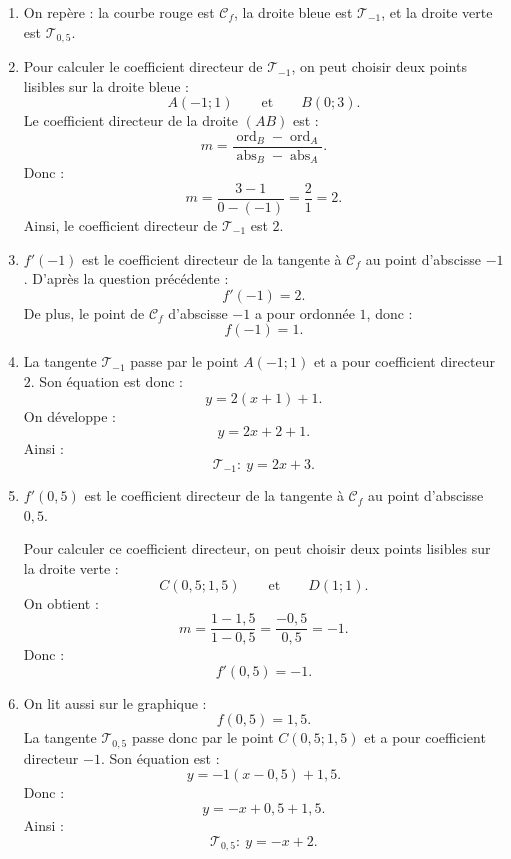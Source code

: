 \documentclass[11pt,a4paper]{article}
\begin{document}
\begin{enumerate}[label=\textbf{\arabic*)}, leftmargin=0.75cm, itemsep=0.35cm]
    \item On repère : la courbe rouge est $\mathcal C_f$, la droite bleue est $\mathcal T_{-1}$, et la droite verte est $\mathcal T_{0{,}5}$.

    \item Pour calculer le coefficient directeur de $\mathcal T_{-1}$, on peut choisir deux points lisibles sur la droite bleue :
    \[
    A(-1;1) \qquad \text{et} \qquad B(0;3).
    \]
    Le coefficient directeur de la droite $(AB)$ est :
    \[
    m=\frac{\operatorname{ord}_B-\operatorname{ord}_A}{\operatorname{abs}_B-\operatorname{abs}_A}.
    \]
    Donc :
    \[
    m=\frac{3-1}{0-(-1)}=\frac{2}{1}=2.
    \]
    Ainsi, le coefficient directeur de $\mathcal T_{-1}$ est $2$.

    \item $f'(-1)$ est le coefficient directeur de la tangente à $\mathcal C_f$ au point d'abscisse $-1$.
    D'après la question précédente :
    \[
    \boxed{f'(-1)=2}.
    \]
    De plus, le point de $\mathcal C_f$ d'abscisse $-1$ a pour ordonnée $1$, donc :
    \[
    \boxed{f(-1)=1}.
    \]

    \item La tangente $\mathcal T_{-1}$ passe par le point $A(-1;1)$ et a pour coefficient directeur $2$.
    Son équation est donc :
    \[
    y=2(x+1)+1.
    \]
    On développe :
    \[
    y=2x+2+1.
    \]
    Ainsi :
    \[
    \boxed{\mathcal T_{-1}:\ y=2x+3}.
    \]

    \item $f'(0{,}5)$ est le coefficient directeur de la tangente à $\mathcal C_f$ au point d'abscisse $0{,}5$.

    Pour calculer ce coefficient directeur, on peut choisir deux points lisibles sur la droite verte :
    \[
    C(0{,}5;1{,}5) \qquad \text{et} \qquad D(1;1).
    \]
    On obtient :
    \[
    m=\frac{1-1{,}5}{1-0{,}5}=\frac{-0{,}5}{0{,}5}=-1.
    \]
    Donc :
    \[
    \boxed{f'(0{,}5)=-1}.
    \]

    \item On lit aussi sur le graphique :
    \[
    f(0{,}5)=1{,}5.
    \]
    La tangente $\mathcal T_{0{,}5}$ passe donc par le point $C(0{,}5;1{,}5)$ et a pour coefficient directeur $-1$.
    Son équation est :
    \[
    y=-1(x-0{,}5)+1{,}5.
    \]
    Donc :
    \[
    y=-x+0{,}5+1{,}5.
    \]
    Ainsi :
    \[
    \boxed{\mathcal T_{0{,}5}:\ y=-x+2}.
    \]
\end{enumerate}
\end{document}
